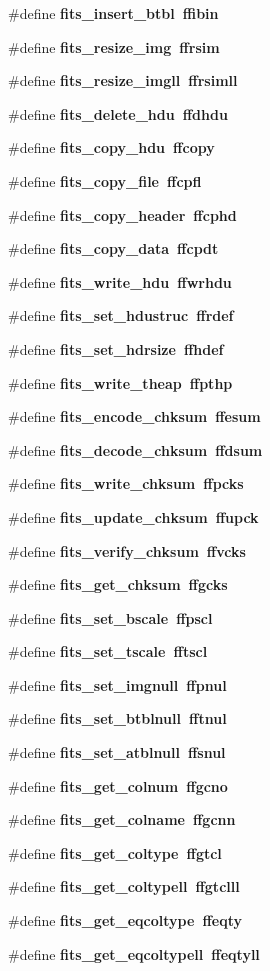 \begin{CompactItemize}
\#define \bf{fits\_\-insert\_\-btbl}~ffibin
\item 
\#define \bf{fits\_\-resize\_\-img}~ffrsim
\item 
\#define \bf{fits\_\-resize\_\-imgll}~ffrsimll
\item 
\#define \bf{fits\_\-delete\_\-hdu}~ffdhdu
\item 
\#define \bf{fits\_\-copy\_\-hdu}~ffcopy
\item 
\#define \bf{fits\_\-copy\_\-file}~ffcpfl
\item 
\#define \bf{fits\_\-copy\_\-header}~ffcphd
\item 
\#define \bf{fits\_\-copy\_\-data}~ffcpdt
\item 
\#define \bf{fits\_\-write\_\-hdu}~ffwrhdu
\item 
\#define \bf{fits\_\-set\_\-hdustruc}~ffrdef
\item 
\#define \bf{fits\_\-set\_\-hdrsize}~ffhdef
\item 
\#define \bf{fits\_\-write\_\-theap}~ffpthp
\item 
\#define \bf{fits\_\-encode\_\-chksum}~ffesum
\item 
\#define \bf{fits\_\-decode\_\-chksum}~ffdsum
\item 
\#define \bf{fits\_\-write\_\-chksum}~ffpcks
\item 
\#define \bf{fits\_\-update\_\-chksum}~ffupck
\item 
\#define \bf{fits\_\-verify\_\-chksum}~ffvcks
\item 
\#define \bf{fits\_\-get\_\-chksum}~ffgcks
\item 
\#define \bf{fits\_\-set\_\-bscale}~ffpscl
\item 
\#define \bf{fits\_\-set\_\-tscale}~fftscl
\item 
\#define \bf{fits\_\-set\_\-imgnull}~ffpnul
\item 
\#define \bf{fits\_\-set\_\-btblnull}~fftnul
\item 
\#define \bf{fits\_\-set\_\-atblnull}~ffsnul
\item 
\#define \bf{fits\_\-get\_\-colnum}~ffgcno
\item 
\#define \bf{fits\_\-get\_\-colname}~ffgcnn
\item 
\#define \bf{fits\_\-get\_\-coltype}~ffgtcl
\item 
\#define \bf{fits\_\-get\_\-coltypell}~ffgtclll
\item 
\#define \bf{fits\_\-get\_\-eqcoltype}~ffeqty
\item 
\#define \bf{fits\_\-get\_\-eqcoltypell}~ffeqtyll

\end{CompactItemize}
